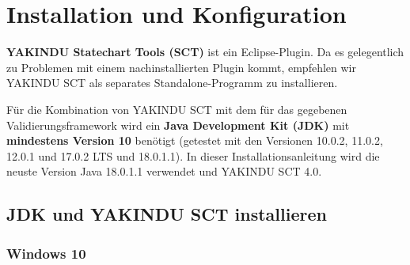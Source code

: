 
\section{Installation und Konfiguration}
\label{sec:installation}


\textbf{YAKINDU Statechart Tools (SCT)} ist ein Eclipse-Plugin.
Da es gelegentlich zu Problemen mit einem nachinstallierten Plugin kommt, empfehlen wir YAKINDU SCT als separates Standalone-Programm zu installieren. 

Für die Kombination von YAKINDU SCT mit dem für das \docProjectTitle{} gegebenen Validierungsframework wird ein \textbf{Java Development Kit (JDK)} mit \textbf{mindestens Version 10} benötigt (getestet mit den Versionen 10.0.2, 11.0.2, 12.0.1 und 17.0.2 LTS und 18.0.1.1). In dieser Installationsanleitung wird die neuste Version Java 18.0.1.1 verwendet und YAKINDU SCT 4.0.










\subsection{JDK und YAKINDU SCT installieren}

\subsubsection{Windows 10}

